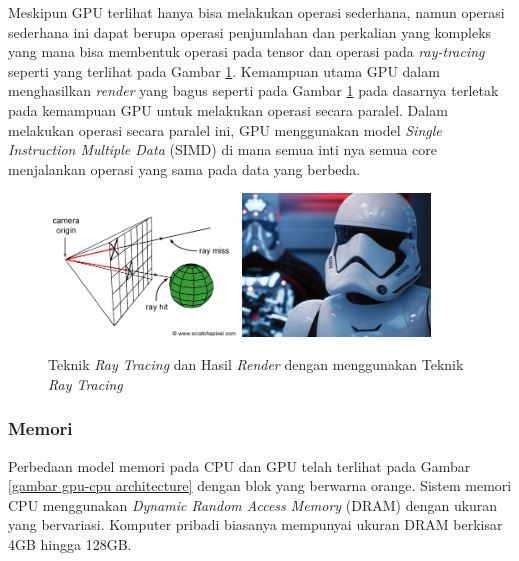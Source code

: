 Meskipun GPU terlihat hanya bisa melakukan operasi sederhana, namun operasi
sederhana ini dapat berupa operasi penjumlahan dan perkalian yang kompleks yang
mana bisa membentuk operasi pada tensor dan operasi pada \emph{ray-tracing}
seperti yang terlihat pada Gambar \ref{gambar ray tracing technique}. Kemampuan
utama GPU dalam menghasilkan \emph{render} yang bagus seperti pada Gambar
\ref{gambar ray tracing technique} pada dasarnya terletak pada kemampuan GPU
untuk melakukan operasi secara paralel. Dalam melakukan operasi secara paralel
ini, GPU menggunakan model \emph{Single Instruction Multiple Data} (SIMD) di
mana semua inti nya semua core menjalankan operasi yang sama pada data yang
berbeda.

\begin{figure}[H]
	\centering
	\includegraphics[width=5cm]{images/rt-setup2.png}
	\includegraphics[width=5cm]{images/Reflections_02.png}
	\caption{Teknik \emph{Ray Tracing} dan Hasil \emph{Render} dengan menggunakan
		Teknik \emph{Ray Tracing}}
	\label{gambar ray tracing technique}
\end{figure}

\subsubsection{Memori}

Perbedaan model memori pada CPU dan GPU telah terlihat pada Gambar \ref{gambar
	gpu-cpu architecture} dengan blok yang berwarna orange. Sistem memori CPU
menggunakan \emph{Dynamic Random Access Memory} (DRAM) dengan ukuran yang
bervariasi. Komputer pribadi biasanya mempunyai ukuran DRAM berkisar 4GB hingga
128GB.

